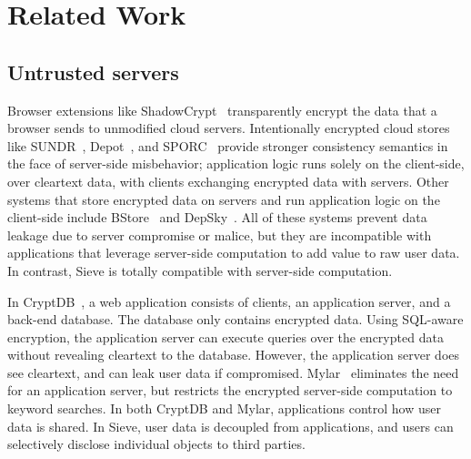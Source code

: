 \chapter{Related Work}
\label{sec:related}


\section{Untrusted servers} 
Browser extensions
like ShadowCrypt~\cite{shadowCrypt} transparently
encrypt the data that a browser sends to
unmodified cloud servers. Intentionally
encrypted cloud stores like SUNDR~\cite{sundr},
Depot~\cite{depot}, and SPORC~\cite{sporc}
provide stronger consistency semantics in the
face of server-side misbehavior; application
logic runs solely on the client-side, over
cleartext data, with clients exchanging encrypted
data with servers. 
Other systems that store encrypted data on servers
and run application logic on the client-side
include BStore~\cite{bstore} and DepSky~\cite{depSky}.
All of these systems prevent
data leakage due to server compromise or malice,
but they are incompatible with applications that
leverage server-side computation to add value to
raw user data. In contrast, Sieve 
is totally compatible with server-side computation.

In CryptDB~\cite{cryptdb}, a web application
consists of clients, an application server,
and a back-end database. The database only
contains encrypted data. Using SQL-aware encryption,
the application server can execute queries over
the encrypted data without revealing cleartext
to the database. However, the application server
does see cleartext, and can leak user data if
compromised. Mylar~\cite{mylar} eliminates the
need for an application server, but restricts
the encrypted server-side computation to keyword
searches. In both CryptDB and Mylar, applications
control how user data is shared. In Sieve, user
data is decoupled from applications, and users
can selectively disclose individual objects to
third parties.

